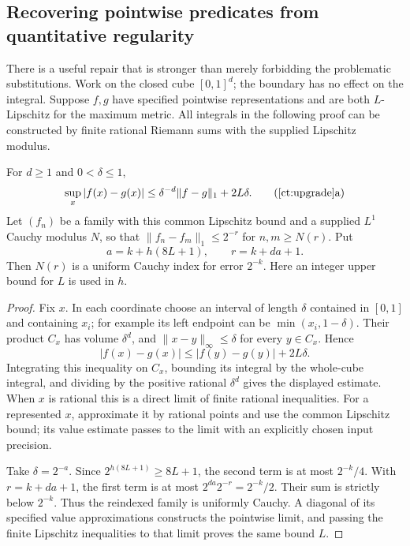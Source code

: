 \subsection{Recovering pointwise predicates from quantitative regularity}

There is a useful repair that is stronger than merely forbidding the
problematic substitutions. Work on the closed cube $[0,1]^d$; the boundary
has no effect on the integral. Suppose $f,g$ have specified pointwise
representations and are both $L$-Lipschitz for the maximum metric.
All integrals in the following proof can be constructed by finite rational
Riemann sums with the supplied Lipschitz modulus.

\begin{theorem}
\label{ct:upgrade}
For $d\geq1$ and $0<\delta\leq1$,
\[
 \sup_x|f(x)-g(x)|
 \leq \delta^{-d}\|f-g\|_1+2L\delta.
 \tag{\ref{ct:upgrade}a}
\]
Let $(f_n)$ be a family with this common Lipschitz bound and a supplied
$L^1$ Cauchy modulus $N$, so that
$\|f_n-f_m\|_1\leq2^{-r}$ for $n,m\geq N(r)$.
Put
\[
 a=k+h(8L+1),\qquad r=k+da+1.
\]
Then $N(r)$ is a uniform Cauchy index for error $2^{-k}$.
Here an integer upper bound for $L$ is used in $h$.
\end{theorem}
\begin{proof}
Fix $x$. In each coordinate choose an interval of length $\delta$ contained
in $[0,1]$ and containing $x_i$; for example its left endpoint can be
$\min(x_i,1-\delta)$. Their product $C_x$ has volume $\delta^d$, and
$\|x-y\|_\infty\leq\delta$ for every $y\in C_x$. Hence
\[
 |f(x)-g(x)|\leq|f(y)-g(y)|+2L\delta.
\]
Integrating this inequality on $C_x$, bounding its integral by the
whole-cube integral, and dividing by the positive rational $\delta^d$
gives the displayed estimate. When $x$ is rational this is a direct limit
of finite rational inequalities. For a represented $x$, approximate it by
rational points and use the common Lipschitz bound; its value estimate
passes to the limit with an explicitly chosen input precision.

Take $\delta=2^{-a}$. Since $2^{h(8L+1)}\geq8L+1$, the second term is at
most $2^{-k}/4$. With $r=k+da+1$, the first term is at most
$2^{da}2^{-r}=2^{-k}/2$. Their sum is strictly below $2^{-k}$.
Thus the reindexed family is uniformly Cauchy. A diagonal of its specified
value approximations constructs the pointwise limit, and passing the
finite Lipschitz inequalities to that limit proves the same bound $L$.
\end{proof}

